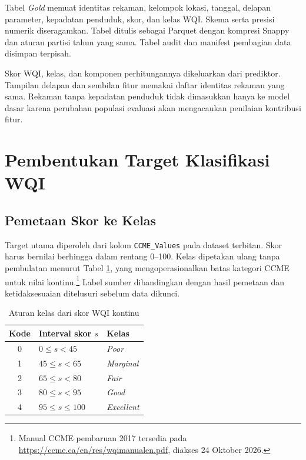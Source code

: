 Tabel \textit{Gold} memuat identitas rekaman, kelompok lokasi, tanggal, delapan parameter, kepadatan penduduk, skor, dan kelas WQI. Skema serta presisi numerik diseragamkan. Tabel ditulis sebagai Parquet dengan kompresi Snappy dan aturan partisi tahun yang sama. Tabel audit dan manifest pembagian data disimpan terpisah.

Skor WQI, kelas, dan komponen perhitungannya dikeluarkan dari prediktor. Tampilan delapan dan sembilan fitur memakai daftar identitas rekaman yang sama. Rekaman tanpa kepadatan penduduk tidak dimasukkan hanya ke model dasar karena perubahan populasi evaluasi akan mengacaukan penilaian kontribusi fitur.

\section{Pembentukan Target Klasifikasi WQI}

\subsection{Pemetaan Skor ke Kelas}

Target utama diperoleh dari kolom \texttt{CCME\_Values} pada dataset terbitan. Skor harus bernilai berhingga dalam rentang 0--100. Kelas dipetakan ulang tanpa pembulatan menurut Tabel \ref{tab:bab3-kelas}, yang mengoperasionalkan batas kategori CCME untuk nilai kontinu.\footnote{\label{fn:bab3-ccme}Manual CCME pembaruan 2017 tersedia pada \url{https://ccme.ca/en/res/wqimanualen.pdf}, diakses 24 Oktober 2026.} Label sumber dibandingkan dengan hasil pemetaan dan ketidaksesuaian ditelusuri sebelum data dikunci.

\begin{table}[H]
    \centering
    \caption{Aturan kelas dari skor WQI kontinu}
    \label{tab:bab3-kelas}
    \small
    \renewcommand{\arraystretch}{1.2}
    \begin{tabularx}{0.86\linewidth}{@{}cp{4.1cm}X@{}}
        \toprule
        Kode & Interval skor $s$ & Kelas \\
        \midrule
        0 & $0\leq s<45$ & \textit{Poor} \\
        1 & $45\leq s<65$ & \textit{Marginal} \\
        2 & $65\leq s<80$ & \textit{Fair} \\
        3 & $80\leq s<95$ & \textit{Good} \\
        4 & $95\leq s\leq100$ & \textit{Excellent} \\
        \bottomrule
    \end{tabularx}
\end{table}

